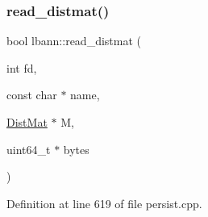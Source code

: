 \subsubsection{\texorpdfstring{read\+\_\+distmat()}{read\_distmat()}}
{\footnotesize\ttfamily bool lbann\+::read\+\_\+distmat (\begin{DoxyParamCaption}\item[{int}]{fd,  }\item[{const char $\ast$}]{name,  }\item[{\hyperlink{base_8hpp_a0fab5387556805cfeac3e7e567bf66c5}{Dist\+Mat} $\ast$}]{M,  }\item[{uint64\+\_\+t $\ast$}]{bytes }\end{DoxyParamCaption})}



Definition at line 619 of file persist.\+cpp.


